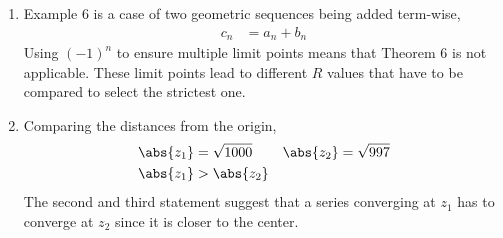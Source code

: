\begin{enumerate}
    \item Example $ 6 $ is a case of two geometric sequences being added term-wise,
          \begin{align}
              c_n & = a_n + b_n
          \end{align}
          Using $ (-1)^n $ to ensure multiple limit points means that Theorem $ 6 $ is
          not applicable. These limit points lead to different $ R $ values that have to
          be compared to select the strictest one.

    \item Comparing the distances from the origin,
          \begin{align}
              \abs{z_1} & = \sqrt{1000} &
              \abs{z_2} & = \sqrt{997}    \\
              \abs{z_1} & > \abs{z_2}
          \end{align}
          The second and third statement suggest that a series converging at $ z_1 $
          has to converge at $ z_2 $ since it is closer to the center.

\end{enumerate}
